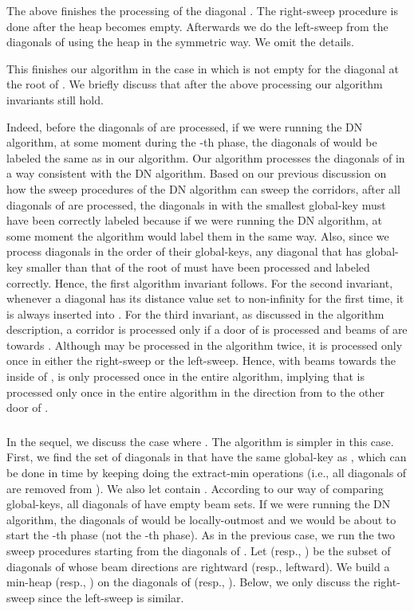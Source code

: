 \documentclass[english,runningheads,11pt]{llncs-revised}
\begin{document}
The above finishes the processing of the diagonal . The
right-sweep procedure is done after the heap  becomes empty.
Afterwards we do the left-sweep from the diagonals of  using the heap  in the
symmetric way. We omit the details.

This finishes our algorithm in the case in which  is not empty
for the diagonal  at the root of . We briefly discuss that
after the above processing our algorithm invariants still hold.

Indeed, before the diagonals of  are processed, if we were running
the DN algorithm, at some moment during the -th phase, the
diagonals of  would be labeled the same as in our algorithm. Our algorithm
processes the diagonals of  in a way consistent with the DN
algorithm. Based on our previous discussion on how the sweep procedures of the DN
algorithm can sweep the corridors, after all diagonals of  are
processed, the diagonals in  with the smallest global-key must have been
correctly labeled because if we were running the DN algorithm, at some
moment the algorithm would label them in the same way. Also, since we
process diagonals in the order of their global-keys, any
diagonal that has global-key smaller than that of the root of  must have
been processed and labeled correctly. Hence, the first algorithm
invariant follows. For the second invariant, whenever a diagonal has
its distance value set to non-infinity for the first time, it is
always inserted into .
For the third invariant, as discussed in
the algorithm description, a corridor  is processed only if a
door  of  is processed and beams of  are towards
. Although  may be processed in the algorithm twice, it is
processed only once in either the right-sweep or the left-sweep.
Hence, with beams towards the inside of ,  is only
processed once in the entire algorithm, implying that  is
processed only once in the entire algorithm in the direction from  to
the other door of .


\subsubsection{}

In the sequel, we discuss the case where .
The algorithm is simpler in this case.  First,
we find the set  of diagonals in  that have the same global-key as , which can be done in  time by keeping doing the extract-min operations (i.e., all diagonals of  are removed from ). We also let  contain . According to our way of comparing global-keys, all
diagonals of  have empty beam sets. If we were running the DN
algorithm, the diagonals of  would be locally-outmost
and we would be about to start the -th phase (not the -th phase).
As in the previous case, we run the two sweep procedures
starting from the diagonals of .
Let  (resp., ) be the subset of diagonals of  whose beam directions
are rightward (resp., leftward).  We build a min-heap  (resp., )
on the diagonals of  (resp., ).
Below, we only discuss the right-sweep since the left-sweep is similar.
\end{document}
